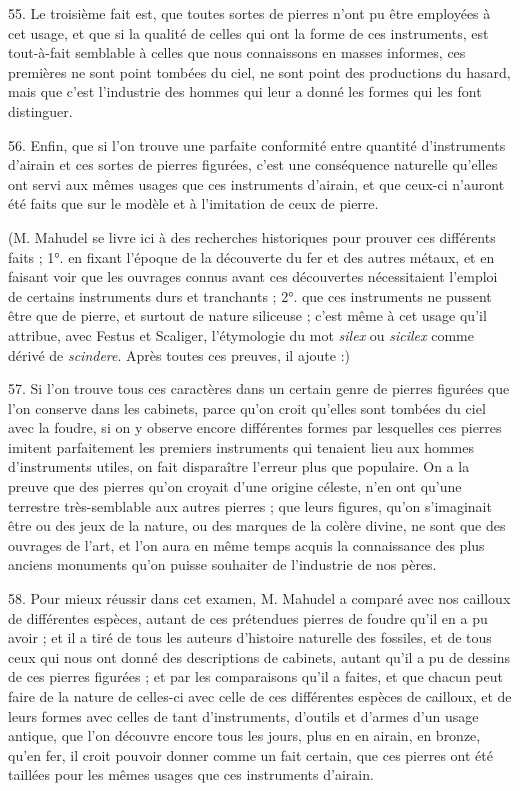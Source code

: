 \documentclass[a4paper, 11pt, oneside, polutonikogreek, french]{article}
\begin{document}
55. Le troisième fait est, que toutes sortes de pierres n'ont pu être employées à cet usage, et que si la qualité de celles qui ont la forme de ces instruments, est tout-à-fait semblable à celles que nous connaissons en masses informes, ces premières ne sont point tombées du ciel, ne sont point des productions du hasard, mais que c'est l'industrie des hommes qui leur a donné les formes qui les font distinguer.

56. Enfin, que si l'on trouve une parfaite conformité entre quantité d'instruments d'airain et ces sortes de pierres figurées, c'est une conséquence naturelle qu'elles ont servi aux mêmes usages que ces instruments d'airain, et que ceux-ci n'auront été faits que sur le modèle et à l'imitation de ceux de pierre.

(M. Mahudel se livre ici à des recherches historiques pour prouver ces différents faits ; 1°. en fixant l'époque de la découverte du fer et des autres métaux, et en faisant voir que les ouvrages connus avant ces découvertes nécessitaient l'emploi de certains instruments durs et tranchants ; 2°. que ces instruments ne pussent être que de pierre, et surtout de nature siliceuse ; c'est même à cet usage qu'il attribue, avec Festus et Scaliger, l'étymologie du mot \emph{silex} ou \emph{sicilex} comme dérivé de \emph{scindere}. Après toutes ces preuves, il ajoute :)

57. \og Si l'on trouve tous ces caractères dans un certain genre de pierres figurées que l'on conserve dans les cabinets, parce qu'on croit qu'elles sont tombées du ciel avec la foudre, si on y observe encore différentes formes par lesquelles ces pierres imitent parfaitement les premiers instruments qui tenaient lieu aux hommes d'instruments utiles, on fait disparaître l'erreur plus que populaire. On a la preuve que des pierres qu'on croyait d'une origine céleste, n'en ont qu'une terrestre très-semblable aux autres pierres ; que leurs figures, qu'on s'imaginait être ou des jeux de la nature, ou des marques de la colère divine, ne sont que des ouvrages de l'art, et l'on aura en même temps acquis la connaissance des plus anciens monuments qu'on puisse souhaiter de l'industrie de nos pères. \fg

58. Pour mieux réussir dans cet examen, M. Mahudel a comparé avec nos cailloux de différentes espèces, autant de ces prétendues pierres de foudre qu'il en a pu avoir ; et il a tiré de tous les auteurs d'histoire naturelle des fossiles, et de tous ceux qui nous ont donné des descriptions de cabinets, autant qu'il a pu de dessins de ces pierres figurées ; et par les comparaisons qu'il a faites, et que chacun peut faire de la nature de celles-ci avec celle de ces différentes espèces de cailloux, et de leurs formes avec celles de tant d'instruments, d'outils et d'armes d'un usage antique, que l'on découvre encore tous les jours, plus en en airain, en bronze, qu'en fer, il croit pouvoir donner comme un fait certain, que ces pierres ont été taillées pour les mêmes usages que ces instruments d'airain.
\end{document}
